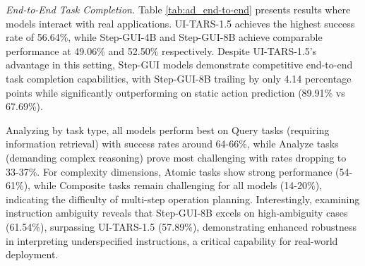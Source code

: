 \noindent\textit{End-to-End Task Completion.}
Table \ref{tab:ad_end-to-end} presents results where models interact with real applications. UI-TARS-1.5 achieves the highest success rate of 56.64\%, while Step-GUI-4B and Step-GUI-8B achieve comparable performance at 49.06\% and 52.50\% respectively. Despite UI-TARS-1.5's advantage in this setting, Step-GUI models demonstrate competitive end-to-end task completion capabilities, with Step-GUI-8B trailing by only 4.14 percentage points while significantly outperforming on static action prediction (89.91\% vs 67.69\%).

Analyzing by task type, all models perform best on Query tasks (requiring information retrieval) with success rates around 64-66\%, while Analyze tasks (demanding complex reasoning) prove most challenging with rates dropping to 33-37\%. For complexity dimensions, Atomic tasks show strong performance (54-61\%), while Composite tasks remain challenging for all models (14-20\%), indicating the difficulty of multi-step operation planning. Interestingly, examining instruction ambiguity reveals that Step-GUI-8B excels on high-ambiguity cases (61.54\%), surpassing UI-TARS-1.5 (57.89\%), demonstrating enhanced robustness in interpreting underspecified instructions, a critical capability for real-world deployment.


